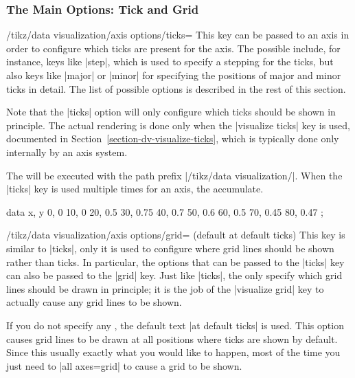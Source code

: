 \subsubsection{The Main Options: Tick and Grid}

\begin{key}{/tikz/data visualization/axis options/ticks=}
  This key can be passed to an axis in order to configure which ticks
  are present for the axis. The possible  include, for
  instance, keys like |step|, which is used to specify a stepping for
  the ticks, but also keys like |major| or |minor| for specifying the
  positions of major and minor ticks in detail. The list of possible
  options is described in the rest of this section.

  Note that the |ticks| option will only configure which ticks should
  be shown in principle. The actual rendering is done only when the
  |visualize ticks| key is used, documented in
  Section~\ref{section-dv-visualize-ticks}, which is typically done
  only internally by an axis system.

  The  will be executed with the path prefix
  |/tikz/data visualization/|. When the |ticks| key is used multiple
  times for an axis, the  accumulate.
\begin{codeexample}[]
\tikz \datavisualization [scientific axes, visualize as line,
                          x axis={ticks={step=24, minor steps between steps=3}, label=hours}]
  data {
    x, y
    0, 0
    10, 0
    20, 0.5
    30, 0.75
    40, 0.7
    50, 0.6
    60, 0.5
    70, 0.45
    80, 0.47
  };
\end{codeexample}
\end{key}

\begin{key}{/tikz/data visualization/axis options/grid=
    (default at default ticks)}
  This key is similar to |ticks|, only it is used to configure where
  grid lines should be shown rather than ticks. In particular, the
  options that can be passed to the |ticks| key can also be passed to
  the |grid| key. Just like |ticks|, the  only specify
  which grid lines should be drawn in principle; it is the job of the
  |visualize grid| key to actually cause any grid lines to be shown.

  If you do not specify any , the default text
  |at default ticks| is used. This option causes grid lines to be
  drawn at all positions where ticks are shown by default. Since this
  usually exactly what you would like to happen, most of the time you
  just need to |all axes=grid| to cause a grid to be shown.
\end{key}

